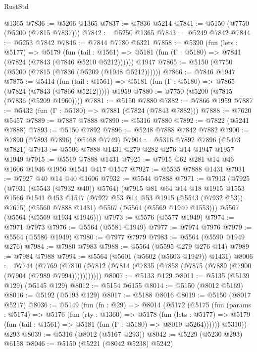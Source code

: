 \begin{lexlean}{RustStd}
\begin{coremodule}
    @1365
@7836 := @5206 @1365
@7837 := @7836 @5214
@7841 := @5150 (@7750 (@5200 (@7815 @7837)))
@7842 := @5250 @1365
@7843 := @5249 @7842
@7844 := @5253 @7842
@7846 := @7844 @7780 @6321
@7858 := @5390
    (fun (lets : @5177) =>
    @5179
      (fun (tail : @1561) => @5181 (fun (Γ : @5180) => @7841 (@7824 (@7843 (@7846 @5210 @5212))))))
    @1947
@7865 := @5150 (@7750 (@5200 (@7815 (@7836 (@5209 (@1948 @5212))))))
@7866 := @7846 @1947
@7875 := @5414
    (fun (tail : @1561) => @5181 (fun (Γ : @5180) => @7865 (@7824 (@7843 (@7866 @5212)))))
    @1959
@7880 := @7750 (@5200 (@7815 (@7836 (@5209 @1960))))
@7881 := @5150 @7880
@7882 := @7866 @1959
@7887 := @5432 (fun (Γ : @5180) => @7881 (@7824 (@7843 @7882)))
@7888 := @7620 @5457
@7889 := @7887 @7888
@7890 := @5316 @7880
@7892 := @7822 (@5241 @7888)
@7893 := @5150 @7892
@7896 := @5248 @7888 @7842 @7882
@7900 := @7890 (@7893 @7896) (@5468 @7749)
@7904 := @5316 @7892 @7896 (@5473 @7821)
@7913 := @5506 @7888 @1431 @279 @282 @276 @14 @1947 @1957 @1949
@7915 := @5519 @7888 @1431
@7925 := @7915 @62 @281 @14 @46 @1606 @1946 @1956 @1541 @417 @1547
@7927 := @5535 @7888 @1431
@7931 := @7927 @40 @14 @40 @1606
@7932 := @5544 @7888
@7971 := @7913
    (@7925
      (@7931 (@5543 (@7932 @40)) @5764)
      (@7915
        @81
        @64
        @14
        @18
        @1915
        @1553
        @1566
        @1541
        @453
        @1547
        (@7927 @53 @14 @53 @1915 (@5543 (@7932 @53)) @7675)
        (@5560 @7888 @1431)
        @5567
        (@5564 (@5569 @1940 @1553)))
      @5567
      (@5564 (@5569 @1934 @1946)))
@7973 := @5576 (@5577 @1949)
@7974 := @7971 @7973
@7976 := @5564 (@5581 @1949)
@7977 := @7974 @7976
@7979 := @5564 (@5586 @1949)
@7980 := @7977 @7979
@7983 := @5564 (@5590 @1949 @276)
@7984 := @7980 @7983
@7988 := @5564 (@5595 @279 @276 @14)
@7989 := @7984 @7988
@7994 := @5564 (@5601 (@5602 (@5603 @1949)) @1431)
@8006 := @7744
    (@7769 (@7810 (@7812 (@7814 (@7835 (@7858 (@7875 (@7889 (@7900 (@7904 (@7989 @7994)))))))))))
@8007 := @5133 @129
@8011 := @5135 (@5139 @129) (@5145 @129)
@8012 := @5154 @6155
@8014 := @5150 (@8012 @5169)
@8016 := @5192 (@5193 @129)
@8017 := @5188 @8016
@8019 := @5150 (@8017 @5217)
@8036 := @5149
    (fun (fn : @29) =>
    @8014
      (@5172
        (@5175
          (fun (params : @5174) =>
          @5176
            (fun (rty : @1360) =>
            @5178
              (fun (lets : @5177) =>
              @5179 (fun (tail : @1561) => @5181 (fun (Γ : @5180) => @8019 @5264))))))
        @5310))
    @293
@8039 := @5316 (@8012 (@5167 @293))
@8042 := @5229 (@5230 @293) @6158
@8046 := @5150 (@5221 (@8042 @5238) @5242)

\end{coremodule}
\end{lexlean}
